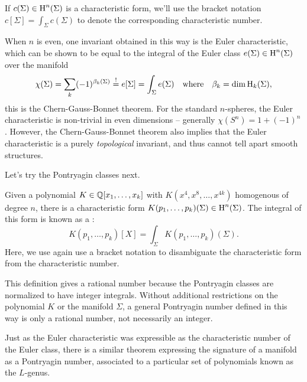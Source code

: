 \begin{convention*}
	If $c(\Sigma)\in \operatorname{H}^n(\Sigma)$ is a characteristic form, we'll use the bracket notation $c[\Sigma]=\int_\Sigma c(\Sigma)$ to denote the corresponding characteristic number.
\end{convention*}

When $n$ is even, one invariant obtained in this way is the Euler characteristic, which can be shown to be equal to the integral of the Euler class $e(\Sigma)\in \operatorname{H}^n(\Sigma)$ over the manifold
\[
	\chi(\Sigma) = \sum_k (-1)^{\beta_k(\Sigma)} \overset{!}{=} e[\Sigma] = \int_\Sigma e(\Sigma)\quad\textrm{where}\quad \beta_k = \dim \operatorname{H}_k(\Sigma),
\]
this is the Chern-Gauss-Bonnet theorem. For the standard $n$-spheres, the Euler characteristic is non-trivial in even dimensions -- generally $\chi(S^n)=1+(-1)^n$. However, the Chern-Gauss-Bonnet theorem also implies that the Euler characteristic is a purely \emph{topological} invariant, and thus cannot tell apart smooth structures.

Let's try the Pontryagin classes next.

\begin{definition}\label{defn:pontryagin_number}
	Given a polynomial $K\in \mathbb{Q}[x_1,\ldots, x_k]$ with $K(x^4, x^8,\ldots, x^{4k})$ homogenous of degree $n$, there is a characteristic form $K(p_1, \ldots, p_k)(\Sigma) \in \operatorname{H}^n(\Sigma)$. The integral of this form is known as a
	:
	\[
		K(p_1, \ldots, p_k)[X] = \int_{\Sigma} K(p_1, \ldots, p_k)(\Sigma).
	\]
	Here, we use again use a bracket notation to disambiguate the characteristic form from the characteristic number.
\end{definition}

\begin{remark}
	This definition gives a rational number because the Pontryagin classes are normalized to have integer integrals. Without additional restrictions on the polynomial $K$ or the manifold $\Sigma$, a general Pontryagin number defined in this way is only a rational number, not necessarily an integer.
\end{remark}

Just as the Euler characteristic was expressible as the characteristic number of the Euler class, there is a similar theorem expressing the signature of a manifold as a Pontryagin number, associated to a particular set of polynomials known as the $L$-genus. 

